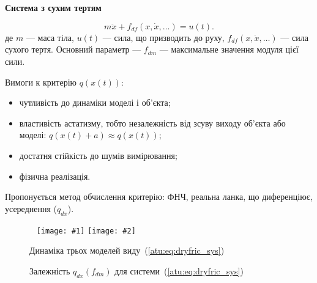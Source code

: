 \documentclass[14pt,handout,utf8]{beamer}
\newlength\DDP
\newcommand{\Xhead}[1]{
 \begin{center}%
      \textbf{#1}%
 \end{center}%
}
\newcommand{\PicDoubleNL}[2]{%
 \begin{center}
    ~ \hfill
    \texttt{[image: \#1]}
    \hfill
    \texttt{[image: \#2]}
    \hfill ~
  \end{center}
}
\begin{document}
\begin{frame}
  \frametitle{~}

  \Xhead{Система з сухим тертям}

  \begin{equation}
    m \ddot{x} + f_{df}( x, \dot{x}, \ldots)  = u(t).
    \label{atu:eq:dryfric_sys}
  \end{equation}
  де
  $m$ --- маса тіла,
  $u(t)$ --- сила, що призводить до руху,
  $f_{df}(x, \dot{x}, \ldots)$ ---  сила сухого тертя.
  Основний параметр --- $f_{dm}$ --- максимальне значення модуля цієї сили.

  Вимоги к  критерію $q(x(t))$:

  \begin{itemize}

    \item
      чутливість до динаміки моделі і об'єкта;

    \item
      властивість астатизму,
      тобто незалежність від зсуву виходу об'єкта або моделі:
      \( q(x(t)+a ) \approx q( x(t) ) \);

    \item
      достатня стійкість до шумів вимірювання;

    \item
      фізична реалізація.

  \end{itemize}

  Пропонується метод обчислення критерію: ФНЧ, реальна ланка, що диференціює,
  усереднення ($q_{dx}$).

  \begin{figure}[htb!]
    \PicDoubleNL{../p5/p/cha/fric/fric_outs1.png}{../p5/p/cha/fric/fric_q-p_f_dm_q.png}
    \parbox[t]{\DDP} {
      \caption{Динаміка трьох моделей виду~(\ref{atu:eq:dryfric_sys})}
      \label{atu:f:fric_outs}
    }
    \hfill
    \parbox[t]{\DDP} {
      \caption{Залежність $q_{dx}(f_{dm})$ для системи~(\ref{atu:eq:dryfric_sys}) }
      \label{atu:f:fric_q}
    }
  \end{figure}


\end{frame}



\end{document}
